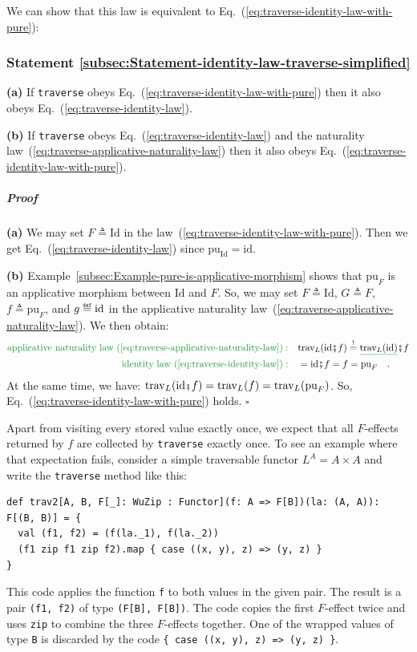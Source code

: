 We can show that this law is equivalent to Eq.~(\ref{eq:traverse-identity-law-with-pure}):

\subsubsection{Statement \label{subsec:Statement-identity-law-traverse-simplified}\ref{subsec:Statement-identity-law-traverse-simplified}}

\textbf{(a)} If \lstinline!traverse! obeys Eq.~(\ref{eq:traverse-identity-law-with-pure})
then it also obeys Eq.~(\ref{eq:traverse-identity-law}).

\textbf{(b)} If \lstinline!traverse! obeys Eq.~(\ref{eq:traverse-identity-law})
and the naturality law~(\ref{eq:traverse-applicative-naturality-law})
then it also obeys Eq.~(\ref{eq:traverse-identity-law-with-pure}).

\subparagraph{Proof}

\textbf{(a)} We may set $F\triangleq\text{Id}$ in the law~(\ref{eq:traverse-identity-law-with-pure}).
Then we get Eq.~(\ref{eq:traverse-identity-law}) since $\text{pu}_{\text{Id}}=\text{id}$.

\textbf{(b)} Example~\ref{subsec:Example-pure-is-applicative-morphism}
shows that $\text{pu}_{F}$ is an applicative morphism between $\text{Id}$
and $F$. So, we may set $F\triangleq\text{Id}$, $G\triangleq F$,
$f\triangleq\text{pu}_{F}$, and $g\triangleq\text{\text{id}}$ in
the applicative naturality law~(\ref{eq:traverse-applicative-naturality-law}).
We then obtain:
\begin{align*}
{\color{greenunder}\text{applicative naturality law~(\ref{eq:traverse-applicative-naturality-law})}:}\quad & \text{trav}_{L}(\text{id}\bef f)\overset{!}{=}\gunderline{\text{trav}_{L}(\text{id})}\bef f\\
{\color{greenunder}\text{identity law~(\ref{eq:traverse-identity-law})}:}\quad & =\text{id}\bef f=f=\text{pu}_{F}\quad.
\end{align*}
At the same time, we have: $\text{trav}_{L}(\text{id}\bef f)=\text{trav}_{L}(f)=\text{trav}_{L}(\text{pu}_{F})$.
So, Eq.~(\ref{eq:traverse-identity-law-with-pure}) holds. $\square$

Apart from visiting every stored value exactly once, we expect that
all $F$-effects returned by $f$ are collected by \lstinline!traverse!
exactly once. To see an example where that expectation fails, consider
a simple traversable functor $L^{A}=A\times A$ and write the \lstinline!traverse!
method like this:
\begin{lstlisting}
def trav2[A, B, F[_]: WuZip : Functor](f: A => F[B])(la: (A, A)): F[(B, B)] = {
  val (f1, f2) = (f(la._1), f(la._2))
  (f1 zip f1 zip f2).map { case ((x, y), z) => (y, z) }
}
\end{lstlisting}
This code applies the function \lstinline!f! to both values in the
given pair. The result is a pair \lstinline!(f1, f2)! of type \lstinline!(F[B], F[B])!.
The code copies the first $F$-effect twice and uses \lstinline!zip!
to combine the three $F$-effects together. One of the wrapped values
of type \lstinline!B! is discarded by the code \lstinline!{ case ((x, y), z) => (y, z) }!.

